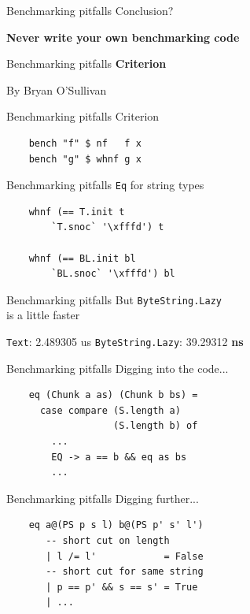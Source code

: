 \documentclass[20pt]{beamer}
\newcommand{\vspaced}{
    \vspace{5mm}
}
\begin{document}
\begin{frame}{Benchmarking pitfalls}
    Conclusion? \\
    \vspaced
    \textbf{Never write your own benchmarking code}
\end{frame}

\begin{frame}{Benchmarking pitfalls}
    \textbf{Criterion} \\
    \vspaced
    By Bryan O'Sullivan
\end{frame}

\begin{frame}[fragile]{Benchmarking pitfalls}
    Criterion \\
    \vspaced
    \begin{lstlisting}
    bench "f" $ nf   f x
    bench "g" $ whnf g x
    \end{lstlisting}
\end{frame}

\begin{frame}[fragile]{Benchmarking pitfalls}
    \texttt{Eq} for string types \\
    \vspaced
    \begin{lstlisting}
    whnf (== T.init t
        `T.snoc` '\xfffd') t

    whnf (== BL.init bl
        `BL.snoc` '\xfffd') bl
    \end{lstlisting}
\end{frame}

\begin{frame}{Benchmarking pitfalls}
    But \texttt{ByteString.Lazy} \\
    is a little faster \\
    \vspaced
    \texttt{Text}: 2.489305 us
    \texttt{ByteString.Lazy}: 39.29312 \textbf{ns}
\end{frame}

\begin{frame}[fragile]{Benchmarking pitfalls}
    Digging into the code... \\
    \vspaced
    \begin{lstlisting}
    eq (Chunk a as) (Chunk b bs) =
      case compare (S.length a)
                   (S.length b) of
        ...
        EQ -> a == b && eq as bs
        ...
    \end{lstlisting}
\end{frame}

\begin{frame}[fragile]{Benchmarking pitfalls}
    Digging further... \\
    \vspaced
    \begin{lstlisting}
    eq a@(PS p s l) b@(PS p' s' l')
       -- short cut on length
       | l /= l'            = False
       -- short cut for same string
       | p == p' && s == s' = True
       | ...
    \end{lstlisting}
\end{frame}
\end{document}
